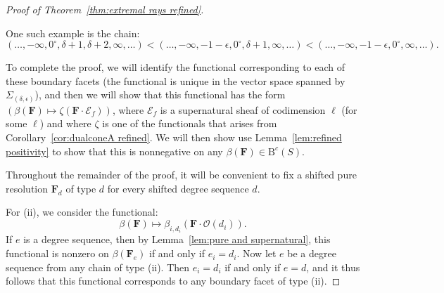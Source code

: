 \documentclass[12pt]{amsart}
\theoremstyle{definition}
\theoremstyle{remark}
\newcommand{\bb}{c}
\newcommand{\dd}{d}
\newcommand{\cO}{\mathcal{O}}
\newcommand{\cE}{\mathcal{E}}
\newcommand{\FF}{\mathbf{F}}
\newcommand{\zp}{\circ}
\newcommand{\BBQ}{\mathrm{B}}
\begin{document}
\begin{proof}[Proof of Theorem~\ref{thm:extremal rays refined}]
\begin{enumerate}[(i)]
%
One such example is the chain:
\[
(\dots,-\infty,0^\zp,\delta+1,\delta+2,\infty,\dots)<(\dots,-\infty,-1-\epsilon,0^\zp,\delta+1,\infty,\dots)<(\dots,-\infty,-1-\epsilon,0^\zp,\infty,\dots).
\]
\end{enumerate} 

To complete the proof, we will identify the functional corresponding to each of these boundary facets (the functional is unique in the vector space spanned by $\Sigma_{(\delta,\epsilon)}$), and then we will show that this functional has the form $(\beta(\FF)\mapsto \zeta(\FF\cdot \cE_f))$, where $\cE_f$ is a supernatural sheaf of codimension $\ell$ (for some $\ell$) and where $\zeta$ is one of the functionals that arises from Corollary~\ref{cor:dualconeA refined}.   We will then show use Lemma~\ref{lem:refined positivity} to show that this is nonnegative on any $\beta(\FF)\in \BBQ^{\bb}(S)$.


Throughout the remainder of the proof, it will be convenient to fix a shifted pure resolution $\FF_{\dd}$ of type $\dd$ for every shifted degree sequence $\dd$.


For (ii), we consider the functional:
\[
\beta(\FF)\mapsto \beta_{i,{d_i}}(\FF\cdot \cO(d_i)).
\]
If $e$ is a degree sequence, then by Lemma~\ref{lem:pure and supernatural}, this functional is nonzero on $\beta(\FF_e)$ if and only if $e_i=d_i$.
Now let $e$ be a degree sequence from any chain of type (ii).  Then $e_i=d_i$ if and only if $e=d$, and it thus follows that this functional corresponds to any boundary facet of type (ii).


\end{proof}
\end{document}
